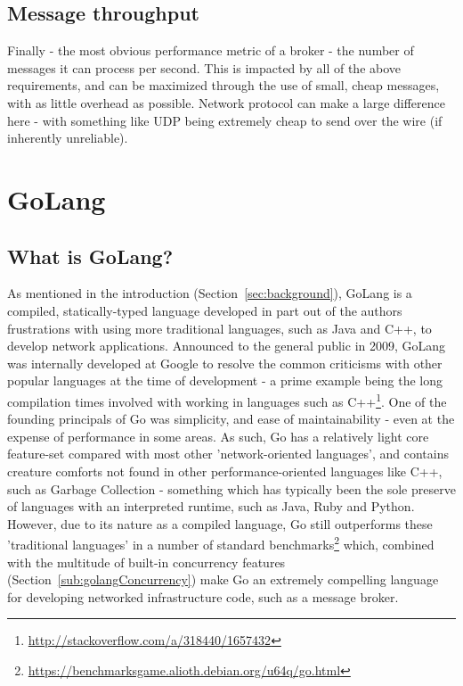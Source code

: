 \subsection{Message throughput}
\label{sub:Message throughput}

Finally - the most obvious performance metric of a broker - the number of
messages it can process per second. This is impacted by all of the above
requirements, and can be maximized through the use of small, cheap messages,
with as little overhead as possible. Network protocol can make a large
difference here - with something like UDP being extremely cheap to send over the
wire (if inherently unreliable).

\section{GoLang}
\label{sec:GoLang}


\subsection{What is GoLang?}
\label{sub:What is GoLang?}

As mentioned in the introduction (Section~\ref{sec:background}), GoLang is a
compiled, statically-typed language developed in part out of the authors
frustrations with using more traditional languages, such as Java and C++, to
develop network applications\cite{kenThompsonInterview}. Announced to the
general public in 2009, GoLang was internally developed at Google to resolve the
common criticisms with other popular languages at the time of development - a
prime example being the long compilation times involved with working in
languages such as C++\footnote{\url{http://stackoverflow.com/a/318440/1657432}}.
One of the founding principals of Go was simplicity, and ease of
maintainability\cite{lessIsExponentiallyMore} - even at the expense of
performance in some areas. As such, Go has a relatively light core feature-set
compared with most other 'network-oriented languages', and contains creature
comforts not found in other performance-oriented languages like C++, such as
Garbage Collection - something which has typically been the sole preserve of
languages with an interpreted runtime, such as Java, Ruby and Python. However,
due to its nature as a compiled language, Go still outperforms these
'traditional languages' in a number of standard
benchmarks\footnote{\url{https://benchmarksgame.alioth.debian.org/u64q/go.html}}
which, combined with the multitude of built-in concurrency features
(Section~\ref{sub:golangConcurrency}) make Go an extremely compelling language
for developing networked infrastructure code, such as a message broker.

